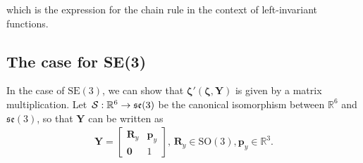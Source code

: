 which is the expression for the chain rule in the context of left-invariant functions. 
\subsection{The case for SE(3)}\label{app:prop-Lop-chain-rule-SE3}
In the case of $\text{SE}(3)$, we can show that $\boldsymbol{\zeta}'(\boldsymbol{\zeta}, \mathbf{Y})$ is given by a  matrix multiplication. Let $\SL:\mathbb{R}^6\to\mathfrak{se}(3)$ be the canonical isomorphism between $\mathbb{R}^6$ and $\mathfrak{se}(3)$, so that $\mathbf{Y}$ can be written as
\begin{align}
    \mathbf{Y} = \begin{bmatrix}
        \mathbf{R}_y & \mathbf{p}_y\\
        \mathbf{0} & 1
    \end{bmatrix},\,\mathbf{R}_y\in\text{SO}(3), \mathbf{p}_y\in\mathbb{R}^3.
\end{align}

